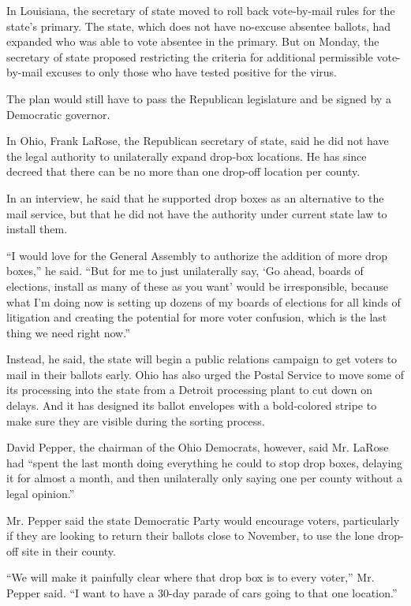 In Louisiana, the secretary of state moved to roll back vote-by-mail
rules for the state's primary. The state, which does not have no-excuse
absentee ballots, had expanded who was able to vote absentee in the
primary. But on Monday, the secretary of state proposed restricting the
criteria for additional permissible vote-by-mail excuses to only those
who have tested positive for the virus.

The plan would still have to pass the Republican legislature and be
signed by a Democratic governor.

In Ohio, Frank LaRose, the Republican secretary of state, said he did
not have the legal authority to unilaterally expand drop-box locations.
He has since decreed that there can be no more than one drop-off
location per county.

In an interview, he said that he supported drop boxes as an alternative
to the mail service, but that he did not have the authority under
current state law to install them.

``I would love for the General Assembly to authorize the addition of
more drop boxes,'' he said. ``But for me to just unilaterally say, `Go
ahead, boards of elections, install as many of these as you want' would
be irresponsible, because what I'm doing now is setting up dozens of my
boards of elections for all kinds of litigation and creating the
potential for more voter confusion, which is the last thing we need
right now.''

Instead, he said, the state will begin a public relations campaign to
get voters to mail in their ballots early. Ohio has also urged the
Postal Service to move some of its processing into the state from a
Detroit processing plant to cut down on delays. And it has designed its
ballot envelopes with a bold-colored stripe to make sure they are
visible during the sorting process.

David Pepper, the chairman of the Ohio Democrats, however, said Mr.
LaRose had ``spent the last month doing everything he could to stop drop
boxes, delaying it for almost a month, and then unilaterally only saying
one per county without a legal opinion.''

Mr. Pepper said the state Democratic Party would encourage voters,
particularly if they are looking to return their ballots close to
November, to use the lone drop-off site in their county.

``We will make it painfully clear where that drop box is to every
voter,'' Mr. Pepper said. ``I want to have a 30-day parade of cars going
to that one location.''

